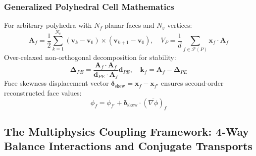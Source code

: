 \documentclass[11pt,a4paper]{article}
\begin{document}
\subsubsection{Generalized Polyhedral Cell Mathematics}
For arbitrary polyhedra with $N_f$ planar faces and $N_v$ vertices:
\begin{equation}
\mathbf{A}_f = \frac{1}{2} \sum_{k=1}^{N_v} (\mathbf{v}_k - \mathbf{v}_0) \times (\mathbf{v}_{k+1} - \mathbf{v}_0), \quad V_P = \frac{1}{d} \sum_{f \in \mathcal{F}(P)} \mathbf{x}_f \cdot \mathbf{A}_f
\end{equation}
Over-relaxed non-orthogonal decomposition for stability:
\begin{equation}
\boldsymbol{\Delta}_{PE} = \frac{\mathbf{A}_f \cdot \mathbf{A}_f}{\mathbf{d}_{PE} \cdot \mathbf{A}_f} \mathbf{d}_{PE}, \quad \mathbf{k}_f = \mathbf{A}_f - \boldsymbol{\Delta}_{PE}
\end{equation}
Face skewness displacement vector $\boldsymbol{\delta}_{\text{skew}} = \mathbf{x}_f - \mathbf{x}_{f'}$ ensures second-order reconstructed face values:
\begin{equation}
\phi_f = \phi_{f'} + \boldsymbol{\delta}_{\text{skew}} \cdot (\overline{\nabla \phi})_f
\end{equation}

\subsection{The Multiphysics Coupling Framework: 4-Way Balance Interactions and Conjugate Transports}
\end{document}
